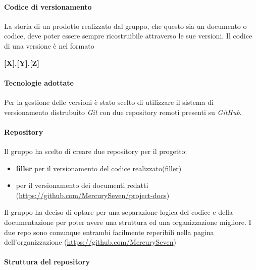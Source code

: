 \paragraph{Codice di versionamento}
\label{cod-versionamento}


La storia di un prodotto realizzato dal gruppo, che questo sia un documento o codice, deve poter essere sempre ricostruibile attraverso le sue versioni. Il codice di una versione è nel formato\newline
\centerline{\textbf{[X].[Y].[Z]}}\newline

\paragraph{Tecnologie adottate}

Per la gestione delle versioni è stato scelto di utilizzare il sistema di versionamento distrubuito \textit{Git} con due repository remoti presenti su \textit{GitHub}.

\paragraph{Repository}

Il gruppo \textit{\Gruppo{}} ha scelto di creare due repository per il progetto:

\begin{itemize}
	\item \textbf{filler} per il versionamento del codice realizzato(\url{filler})
	\item \textbf{\repoDoc{}} per il versionamento dei documenti redatti (\url{https://github.com/MercurySeven/project-docs})
\end{itemize}

Il gruppo ha deciso di optare per una separazione logica del codice e della documentazione per poter avere una struttura ed una organizzazione migliore. I due repo sono comunque entrambi facilmente reperibili nella pagina dell'organizzazione (\url{https://github.com/MercurySeven})

\paragraph{Struttura del repository}

